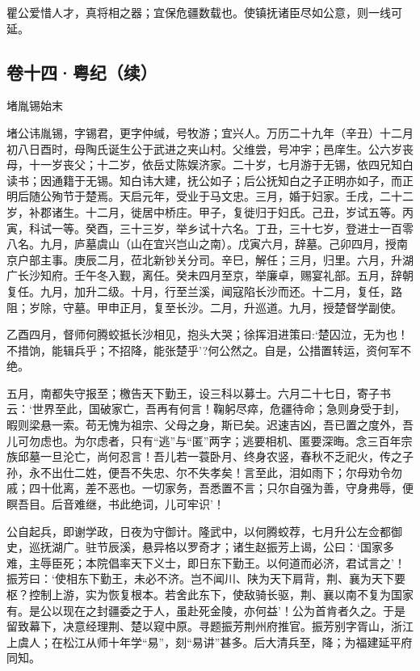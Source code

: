 \documentclass[]{article}
\begin{document}
瞿公爱惜人才，真将相之器；宜保危疆数载也。使镇抚诸臣尽如公意，则一线可延。

\hypertarget{header-n82}{%
\subsection{卷十四·粤纪（续）}\label{header-n82}}

堵胤锡始末

堵公讳胤锡，字锡君，更字仲缄，号牧游；宜兴人。万历二十九年（辛丑）十二月初八日酉时，母陶氏诞生公于武进之夹山村。父维尝，号冲宇；邑庠生。公六岁丧母，十一岁丧父；十二岁，依岳丈陈娱济家。二十岁，七月游于无锡，依四兄知白读书；因通籍于无锡。知白讳大建，抚公如子；后公抚知白之子正明亦如子，而正明后随公殉节于楚焉。天启元年，受业于马文忠。三月，婚于妇家。壬戌，二十二岁，补郡诸生。十二月，徙居中桥庄。甲子，复徙归于妇氏。己丑，岁试五等。丙寅，科试一等。癸酉，三十三岁，举乡试十六名。丁丑，三十七岁，登进士一百零八名。九月，庐墓虞山（山在宜兴岂山之南）。戊寅六月，辞墓。己卯四月，授南京户部主事。庚辰二月，莅北新钞关分司。辛巳，解任；三月，归里。六月，升湖广长沙知府。壬午冬入觐，离任。癸未四月至京，举廉卓，赐宴礼部。五月，辞朝复任。九月，加升二级。十月，行至兰溪，闻寇陷长沙而还。十二月，复任，路阻；岁除，守墓。甲申正月，复至长沙。二月，升巡道。九月，授楚督学副使。

乙酉四月，督师何腾蛟抵长沙相见，抱头大哭；徐挥泪进策曰:`楚囚泣，无为也！不措饷，能辑兵乎；不招降，能张楚乎'?何公然之。自是，公措置转运，资何军不绝。

五月，南都失守报至；檄告天下勤王，设三科以募士。六月二十七日，寄子书云：`世界至此，国破家亡，吾再有何言！鞠躬尽瘁，危疆待命；急则身受于刲，暇则梁悬一索。苟无愧为祖宗、父母之身，斯已矣。迟速吉凶，吾已置之度外，吾儿可勿虑也。为尔虑者，只有``逃''与``匿''两字；逃要相机、匿要深晦。念三百年宗族邱墓一旦沦亡，尚何忍言！吾儿若一蓑卧月、终身农竖，春秋不乏祀火，传之子孙，永不出仕二姓，便吾不失忠、尔不失孝矣！言至此，泪如雨下；尔母劝令勿戚；四十仳离，差不恶也。一切家务，吾悉置不言；只尔自强为善，守身弗辱，便瞑吾目。后音难继，书此绝词，儿可牢识'！

公自起兵，即谢学政，日夜为守御计。隆武中，以何腾蛟荐，七月升公左佥都御史，巡抚湖广。驻节辰溪，悬异格以罗奇才；诸生赵振芳上谒，公曰：`国家多难，主辱臣死；本院倡率天下义士，即日东下勤王。以何道而必济，君试言之'！振芳曰：`使相东下勤王，未必不济。岂不闻川、陕为天下肩背，荆、襄为天下要枢？控制上游，实为恢复根本。若舍此东下，使敌骑长驱，荆、襄以南不复为国家有。是公以现在之封疆委之于人，虽赴死金陵，亦何益'！公为首肯者久之。于是留致幕下，决意经理荆、楚以窥中原。寻题振芳荆州府推官。振芳别字胥山，浙江上虞人；在松江从师十年学``易''，刻``易讲''甚多。后大清兵至，降；为福建延平府同知。
\end{document}
